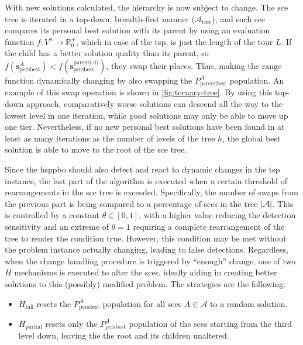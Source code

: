 With new solutions calculated, the hierarchy is now subject to change. The \gls{sce} tree is iterated in a top-down, breadth-first manner ($\mathcal{A}_\text{tree}$), and each \gls{sce} compares its personal best solution with its parent by using an evaluation function $f : V^n \rightarrow \mathbb{R}_{0}^{+}$, which in case of the \gls{tsp}, is just the length of the tour $L$. If the child has a better solution quality than its parent, so $f(\mathbf{s}^A_{\text{persbest}}) < f(\mathbf{s}^{\text{parent($A$)}}_{\text{persbest}})$, they swap their places. Thus, making the $\text{range}$ function dynamically changing by also swapping the $P^{A}_{\text{parentbest}}$ population. An example of this swap operation is shown in \cref{fig:ternary-tree}. By using this top-down approach, comparatively worse solutions can descend all the way to the lowest level in one iteration, while good solutions may only be able to move up one tier. Nevertheless, if no new personal best solutions have been found in at least as many iterations as the number of levels of the tree $h$, the global best solution is able to move to the root of the \gls{sce} tree.

Since the \gls{hsppbo} should also detect and react to dynamic changes in the \gls{tsp} instance, the last part of the algorithm is executed when a certain threshold of rearrangements in the \gls{sce} tree is exceeded. Specifically, the number of swaps from the previous part is being compared to a percentage of \glspl{sce} in the tree $\left\lvert\mathcal{A}\right\rvert$. This is controlled by a constant $\theta \in [0,1]$, with a higher value reducing the detection sensitivity and an extreme of $\theta = 1$ requiring a complete rearrangement of the tree to render the condition true. However, this condition may be met without the problem instance actually changing, leading to false detections. Regardless, when the change handling procedure is triggered by \enquote{enough} change, one of two $H$ mechanisms is executed to alter the \glspl{sce}, ideally aiding in creating better solutions to this (possibly) modified problem. The strategies are the following:
\begin{itemize}
	\item $H_\text{full}$ resets the $P^{A}_{\text{persbest}}$ population for all \glspl{sce} $A \in \mathcal{A}$ to a random solution.
	\item $H_\text{partial}$ resets only the $P^{A}_{\text{persbest}}$ population of the \glspl{sce} starting from the third level down, leaving the the root and its children unaltered.
\end{itemize}

